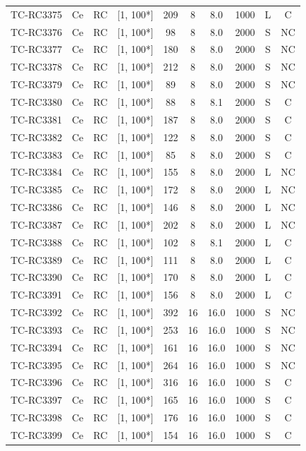 \begin{longtable}{lccccccccc}
TC-RC3375 & Ce & RC & [1, 100*] & 209 & 8 & 8.0 & 1000 & L & C \\
TC-RC3376 & Ce & RC & [1, 100*] & 98 & 8 & 8.0 & 2000 & S & NC \\
TC-RC3377 & Ce & RC & [1, 100*] & 180 & 8 & 8.0 & 2000 & S & NC \\
TC-RC3378 & Ce & RC & [1, 100*] & 212 & 8 & 8.0 & 2000 & S & NC \\
TC-RC3379 & Ce & RC & [1, 100*] & 89 & 8 & 8.0 & 2000 & S & NC \\
TC-RC3380 & Ce & RC & [1, 100*] & 88 & 8 & 8.1 & 2000 & S & C \\
TC-RC3381 & Ce & RC & [1, 100*] & 187 & 8 & 8.0 & 2000 & S & C \\
TC-RC3382 & Ce & RC & [1, 100*] & 122 & 8 & 8.0 & 2000 & S & C \\
TC-RC3383 & Ce & RC & [1, 100*] & 85 & 8 & 8.0 & 2000 & S & C \\
TC-RC3384 & Ce & RC & [1, 100*] & 155 & 8 & 8.0 & 2000 & L & NC \\
TC-RC3385 & Ce & RC & [1, 100*] & 172 & 8 & 8.0 & 2000 & L & NC \\
TC-RC3386 & Ce & RC & [1, 100*] & 146 & 8 & 8.0 & 2000 & L & NC \\
TC-RC3387 & Ce & RC & [1, 100*] & 202 & 8 & 8.0 & 2000 & L & NC \\
TC-RC3388 & Ce & RC & [1, 100*] & 102 & 8 & 8.1 & 2000 & L & C \\
TC-RC3389 & Ce & RC & [1, 100*] & 111 & 8 & 8.0 & 2000 & L & C \\
TC-RC3390 & Ce & RC & [1, 100*] & 170 & 8 & 8.0 & 2000 & L & C \\
TC-RC3391 & Ce & RC & [1, 100*] & 156 & 8 & 8.0 & 2000 & L & C \\
TC-RC3392 & Ce & RC & [1, 100*] & 392 & 16 & 16.0 & 1000 & S & NC \\
TC-RC3393 & Ce & RC & [1, 100*] & 253 & 16 & 16.0 & 1000 & S & NC \\
TC-RC3394 & Ce & RC & [1, 100*] & 161 & 16 & 16.0 & 1000 & S & NC \\
TC-RC3395 & Ce & RC & [1, 100*] & 264 & 16 & 16.0 & 1000 & S & NC \\
TC-RC3396 & Ce & RC & [1, 100*] & 316 & 16 & 16.0 & 1000 & S & C \\
TC-RC3397 & Ce & RC & [1, 100*] & 165 & 16 & 16.0 & 1000 & S & C \\
TC-RC3398 & Ce & RC & [1, 100*] & 176 & 16 & 16.0 & 1000 & S & C \\
TC-RC3399 & Ce & RC & [1, 100*] & 154 & 16 & 16.0 & 1000 & S & C \\

\end{longtable}
